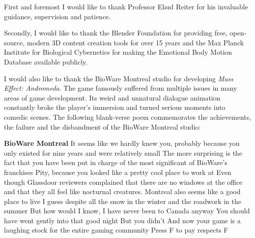 \documentclass[phd]{abdnthesis}
\begin{document}
\begin{acknowledgements}
  First and foremost I would like to thank Professor Ehud Reiter for his invaluable guidance, supervision and patience. 

  Secondly, I would like to thank the Blender Foundation for providing free, open-source, modern 3D content creation tools for over 15 years and the Max Planck Institute for Biological Cybernetics for making the Emotional Body Motion Database available publicly.
  
  I would also like to thank the BioWare Montreal studio for developing \textit{Mass Effect: Andromeda}. The game famously suffered from multiple issues in many areas of game development. Its weird and unnatural dialogue animation constantly broke the player's immersion and turned serious moments into comedic scenes. The following blank-verse poem commemorates the achievements, the failure and the disbandment of the BioWare Montreal studio:
  
{
  \fontsize{9pt}{6pt}\selectfont
	  \bigskip
	  \noindent \textbf{BioWare Montreal}\newline
	  It seems like we hardly knew you,\newline
	  probably because you only existed for nine years and were relatively small\newline
	  The more surprising is the fact that\newline
	  you have been put in charge of the most significant of BioWare's franchises\newline
	  \newline
	  Pity,\newline
	  because you looked like a pretty cool place to work at\newline
	  Even though Glassdoor reviewers complained that there are no windows at the office\newline
	  and that they all feel like nocturnal creatures.\newline
	  Montreal also seems like a good place to live I guess\newline
	  despite all the snow in the winter and the roadwork in the summer\newline
	  But how would I know, I have never been to Canada anyway\newline
	  \newline
	  You should have went gently into that good night\newline
	  But you didn't\newline
	  And now your game is a laughing stock for the entire gaming community\newline
	  Press F to pay respects\newline
	  F
}
  
  
  
\end{acknowledgements}
\end{document}
